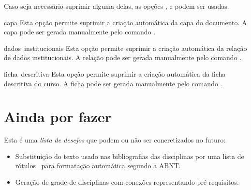 \documentclass[a4paper, 11pt]{article}
\begin{document}
Caso seja necessário suprimir alguma delas, as opções ,  e  podem ser usadas.

\begin{Optiondef}{capa}{}{}
    Esta opção permite suprimir a criação automática da capa do documento. A capa pode ser gerada manualmente pelo comando .
\end{Optiondef}

\begin{Optiondef}{dados~institucionais}{}{}
    Esta opção permite suprimir a criação automática da relação de dados institucionais. A relação pode ser gerada manualmente pelo comando .
\end{Optiondef}

\begin{Optiondef}{ficha~descritiva}{}{}
    Esta opção permite suprimir a criação automática da ficha descritiva do curso. A ficha pode ser gerada manualmente pelo comando .
\end{Optiondef}

\begin{PDExample}
\end{PDExample}

\section{Ainda por fazer}
Esta é uma \textit{lista de desejos} que podem ou não ser concretizados no futuro:

\begin{itemize}
    \item Substituição do texto usado nas bibliografias das disciplinas por uma lista de rótulos \BibTeX\ para formatação automática segundo a ABNT.
    \item Geração de grade de disciplinas com conexões representando pré-requisitos.
\end{itemize}

\printindex
\end{document}
